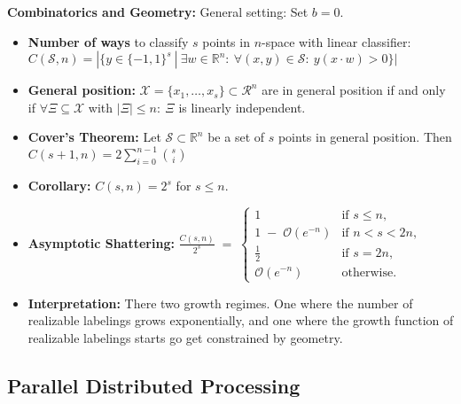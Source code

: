 \textbf{Combinatorics and Geometry:} General setting: Set $b = 0$.
\begin{itemize}
    \item \textbf{Number of ways} to classify $s$ points in $n$-space with linear classifier: $C(\mathcal{S}, n) = |\{y \in \{-1, 1\}^s\ | \ \exists w \in \mathbb{R}^n: \ \forall(x, y) \in \mathcal{S} : \ y(x \cdot w) > 0\}|$
    \item \textbf{General position:} $\mathcal{X}=\{x_1, \dots, x_s\} \subset \mathcal{R}^n$ are in general position if and only if $\forall \Xi \subseteq \mathcal{X}$ with $|\Xi| \leq n: \ \Xi$ is linearly independent.
    \item \textbf{Cover's Theorem:} Let $\mathcal{S} \subset \mathbb{R}^n$ be a set of $s$ points in general position. Then $C(s + 1, n) = 2 \sum_{i = 0}^{n-1} {s \choose i}$
    \item \textbf{Corollary:} $C(s, n) = 2^s$ for $s \leq n$.
    \item \textbf{Asymptotic Shattering:} 
        $\frac{C(s,n)}{2^s} \;=\;
        \begin{cases}
          1 & \text{if } s \le n,\\
          1 \;-\; \mathcal{O}(e^{-n}) & \text{if } n < s < 2n,\\
          \tfrac12 & \text{if } s = 2n,\\
          \mathcal{O}(e^{-n}) & \text{otherwise}.
        \end{cases}$
    \item \textbf{Interpretation:} There two growth regimes. One where the number of realizable labelings grows exponentially, and one where the growth function of realizable labelings starts go get constrained by geometry.
\end{itemize}

\subsection{Parallel Distributed Processing}

%


